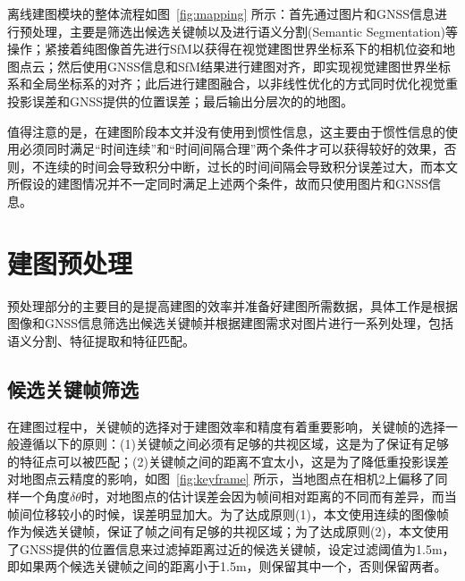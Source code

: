 离线建图模块的整体流程如图~\ref{fig:mapping} 所示：首先通过图片和GNSS信息进行预处理，主要是筛选出候选关键帧以及进行语义分割(Semantic Segmentation)等操作；紧接着纯图像首先进行SfM以获得在视觉建图世界坐标系下的相机位姿和地图点云；然后使用GNSS信息和SfM结果进行建图对齐，即实现视觉建图世界坐标系和全局坐标系的对齐；此后进行建图融合，以非线性优化的方式同时优化视觉重投影误差和GNSS提供的位置误差；最后输出分层次的的地图。

值得注意的是，在建图阶段本文并没有使用到惯性信息，这主要由于惯性信息的使用必须同时满足“时间连续”和“时间间隔合理”两个条件才可以获得较好的效果，否则，不连续的时间会导致积分中断，过长的时间间隔会导致积分误差过大，而本文所假设的建图情况并不一定同时满足上述两个条件，故而只使用图片和GNSS信息。

\section{建图预处理}
预处理部分的主要目的是提高建图的效率并准备好建图所需数据，具体工作是根据图像和GNSS信息筛选出候选关键帧并根据建图需求对图片进行一系列处理，包括语义分割、特征提取和特征匹配。

\subsection{候选关键帧筛选}
在建图过程中，关键帧的选择对于建图效率和精度有着重要影响，关键帧的选择一般遵循以下的原则：(1)关键帧之间必须有足够的共视区域，这是为了保证有足够的特征点可以被匹配；(2)关键帧之间的距离不宜太小，这是为了降低重投影误差对地图点云精度的影响，如图~\ref{fig:keyframe} 所示，当地图点在相机2上偏移了同样一个角度$\delta \theta$时，对地图点的估计误差会因为帧间相对距离的不同而有差异，而当帧间位移较小的时候，误差明显加大。为了达成原则(1)，本文使用连续的图像帧作为候选关键帧，保证了帧之间有足够的共视区域；为了达成原则(2)，本文使用了GNSS提供的位置信息来过滤掉距离过近的候选关键帧，设定过滤阈值为1.5m，即如果两个候选关键帧之间的距离小于1.5m，则保留其中一个，否则保留两者。

